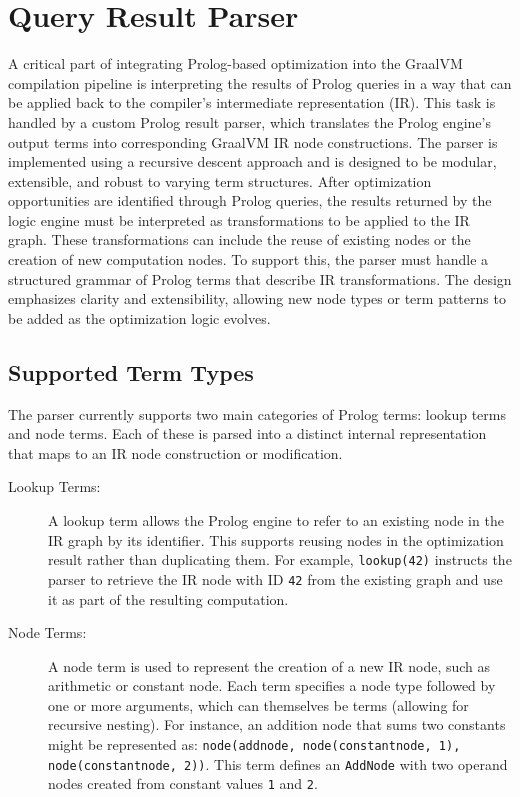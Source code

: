 \section{Query Result Parser}
A critical part of integrating Prolog-based optimization into the GraalVM compilation pipeline is interpreting the results of Prolog queries in a way that can be applied back to the compiler’s intermediate representation (IR). This task is handled by a custom Prolog result parser, which translates the Prolog engine’s output terms into corresponding GraalVM IR node constructions. The parser is implemented using a recursive descent approach and is designed to be modular, extensible, and robust to varying term structures. After optimization opportunities are identified through Prolog queries, the results returned by the logic engine must be interpreted as transformations to be applied to the IR graph. These transformations can include the reuse of existing nodes or the creation of new computation nodes. To support this, the parser must handle a structured grammar of Prolog terms that describe IR transformations. The design emphasizes clarity and extensibility, allowing new node types or term patterns to be added as the optimization logic evolves.

\subsection{Supported Term Types}

The parser currently supports two main categories of Prolog terms: lookup terms and node terms.
Each of these is parsed into a distinct internal representation that maps to an IR node construction or modification.
\begin{description}
    \item[Lookup Terms:] A lookup term allows the Prolog engine to refer to an existing node in the IR graph by its identifier. This supports reusing nodes in the optimization result rather than duplicating them. For example, \texttt{lookup(42)} instructs the parser to retrieve the IR node with ID \texttt{42} from the existing graph and use it as part of the resulting computation.
    \item[Node Terms:] A node term is used to represent the creation of a new IR node, such as arithmetic or constant node. Each term specifies a node type followed by one or more arguments, which can themselves be terms (allowing for recursive nesting). For instance, an addition node that sums two constants might be represented as: \texttt{node(addnode, node(constantnode, 1), node(constantnode, 2))}. This term defines an \texttt{AddNode} with two operand nodes created from constant values \texttt{1} and \texttt{2}.
\end{description}
